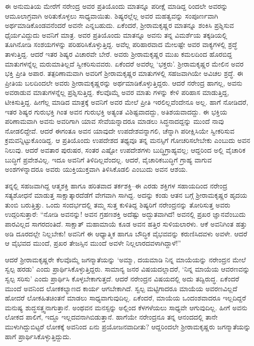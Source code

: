 ಈ ಅನುಮತಿಯ ಮೇರೆಗೆ ನರೇಂದ್ರ ಅವರ ಪ್ರತಿಯೊಂದು ಮಾತನ್ನೂ ಪರೀಕ್ಷೆ ಮಾಡಿದ್ದ ರಿಂದಲೇ ಅವರನ್ನು ಆಮೂಲಾಗ್ರವಾಗಿ ಅರಿತುಕೊಳ್ಳಲು ಸಾಧ್ಯವಾಯಿತು. ಶಿಷ್ಯರಲ್ಲೆಲ್ಲ ಅವರ ಮಹತ್ವವನ್ನು ಸಂಪೂರ್ಣವಾಗಿ ಅರ್ಥಮಾಡಿಕೊಂಡವನೆಂದರೆ ಅವನೇ ಎನ್ನಬಹುದು. ಏಕೆಂದರೆ, ಶ್ರೀರಾಮಕೃಷ್ಣರ ಮಾತನ್ನೂ ಶಂಕಿಸಿ ಪ್ರಶ್ನಿಸುವ ಧೈರ್ಯವಿದ್ದುದು ಅವನಿಗೆ ಮಾತ್ರ. ಅವರ ಪ್ರತಿಯೊಂದು ಮಾತನ್ನೂ ಅವನು ತನ್ನ ವಿಮರ್ಶೆಯ ತಕ್ಕಡಿಯಲ್ಲಿ ತೂಗಿನೋಡಿ ಸಂಶಯಗಳನ್ನು ಪರಿಹರಿಸಿಕೊಳ್ಳುತ್ತಿದ್ದ. ಅವೆಲ್ಲ ಪರಿಹಾರವಾದ ಮೇಲಷ್ಟೇ ಅವರ ವಾಕ್ಯಗಳಲ್ಲಿ ಶ್ರದ್ಧೆ ತಾಳುತ್ತಿದ್ದ. ಆದರೆ ಇತರ ಶಿಷ್ಯರ ವಿಚಾರವೇ ಬೇರೆ. ಅವರು ಶ್ರೀರಾಮಕೃಷ್ಣರ ಮುಖ ಕಮಲದಿಂದ ಹೊರಬಿದ್ದ ಮಾತುಗಳನ್ನೆಲ್ಲ ಮರುಮಾತಿಲ್ಲದೆ ಸ್ವೀಕರಿಸುವವರು. ಏಕೆಂದರೆ ಅವರೆಲ್ಲ ‘ಭಕ್ತರು’. ಶ್ರೀರಾಮಕೃಷ್ಣರ ಮೇಲಿನ ಅವರ ಭಕ್ತಿ ಪ್ರೀತಿ ಅಪಾರ. ತತ್ಪರಿಣಾಮವಾಗಿ ಅವರಿಗೆ ಶ್ರೀರಾಮಕೃಷ್ಣರ ಮಾತುಗಳಲ್ಲಿ ಸಹಜವಾಗಿಯೇ ಅವಿಚಲ ಶ್ರದ್ಧೆ. ಈ ಪ್ರೀತಿಯ ಬಲದಿಂದಲೇ ಅವರು ಶ್ರೀರಾಮಕೃಷ್ಣರನ್ನು ಅರ್ಥಮಾಡಿಕೊಳ್ಳುತ್ತಿದ್ದರು. ಆದರೆ ನರೇಂದ್ರ ಹಾಗಲ್ಲ, ಅವನು ಅವರಾಡುವ ಮಾತುಗಳನ್ನೆಲ್ಲ ಪ್ರಶ್ನಿಸುತ್ತಿದ್ದ. ಕೆಲವೊಮ್ಮೆ ಅವರ ಮಾತು ಗಳನ್ನು ಕೇಳಿ ಪರಿಹಾಸ ಮಾಡುತ್ತಿದ್ದ, ಟೀಕಿಸುತ್ತಿದ್ದ. ಹೀಗೆಲ್ಲ ಮಾಡಿದ ಮಾತ್ರಕ್ಕೆ ಅವನಿಗೆ ಅವರ ಮೇಲೆ ಪ್ರೀತಿ ಇರಲಿಲ್ಲವೆಂದೇನೂ ಅಲ್ಲ. ಹಾಗೆ ನೋಡಿದರೆ, ಇತರ ಶಿಷ್ಯರ ಗುರುಭಕ್ತಿ ಗಿಂತ ಅವನ ಗುರುಭಕ್ತಿ ಅತ್ಯಂತ ವಿಶಿಷ್ಟವಾದದ್ದು, ಅತಿಶಯವಾದದ್ದು. ಈ ಭಕ್ತಿಯ ಪರಿಣಾಮವಾಗಿ ಅವನು ಅವರಿಗಾಗಿ ಯಾವ ಸೇವೆಯನ್ನಾದರೂ ಮಾಡಲು ಸಿದ್ಧನಾದದ್ದನ್ನು ಮುಂದೆ ನಾವು ನೋಡಲಿದ್ದೇವೆ. ಆದರೆ ಈಗಂತೂ ಅವನ ಯಾವುದೇ ಉಪದೇಶವನ್ನಾಗಲಿ, ಚೆನ್ನಾಗಿ ಪರೀಕ್ಷಿಸಿಯೇ ಸ್ವೀಕರಿಸುವ ಕ್ರಮವನ್ನಿಟ್ಟುಕೊಂಡಿದ್ದ. ಆ ಪ್ರತಿಯೊಂದು ಉಪದೇಶದ ತಥ್ಯವೂ ತನ್ನ ಮನಸ್ಸಿಗೆ ಗೋಚರಿಸಲೇಬೇಕು ಎಂಬುದು ಅವನ ನಿಲುವು. ಆದರೆ ಅವತಾರ ಪುರುಷರ, ಸಂತರ ಎಷ್ಟೋ ಉಪದೇಶಗಳು ಬುದ್ಧಿಗ್ರಾಹ್ಯವಲ್ಲ; ಆದ್ದರಿಂದ ಅಲ್ಲಿ ವೈಚಾರಿಕ ಬುದ್ಧಿಗೆ ಪ್ರವೇಶವಿಲ್ಲ. ಇದೂ ಅವನಿಗೆ ತಿಳಿದಿಲ್ಲವೆಂದಲ್ಲ. ಆದರೆ, ವೈಚಾರಿಕಬುದ್ಧಿಗೆ ಗ್ರಾಹ್ಯ ವಾಗುವ ಅಂಶಗಳನ್ನಾದರೂ ಅವರು ಯುಕ್ತಿಯುಕ್ತವಾಗಿ ತಿಳಿಸಿಕೊಡಲಿ ಎಂಬುದು ಅವನ ಆಶಯ.

ತನ್ನಲ್ಲಿ ಸಹಜವಾಗಿದ್ದ ಆತ್ಮಶಕ್ತಿ ಹಾಗೂ ಹರಿತವಾದ ತರ್ಕಶಕ್ತಿ–ಈ ಎರಡು ಶಕ್ತಿಗಳ ಸಹಾಯದಿಂದ ನರೇಂದ್ರ ಸತ್ಯಶೋಧನೆ ಮಾಡುತ್ತ ಸಾಕ್ಷಾತ್ಕಾರದೆಡೆಗೆ ವೇಗವಾಗಿ ಸಾಗಿದ್ದ. ಅದನ್ನು ಕಂಡು ಆತನ ಬಗ್ಗೆ ಶ್ರೀರಾಮಕೃಷ್ಣರ ಹೃದಯ ತುಂಬಿ ಬರುತ್ತಿತ್ತು. ಒಂದು ಸಂದರ್ಭದಲ್ಲಿ ತಮ್ಮ ಸುತ್ತ ಕುಳಿತಿದ್ದ ಶಿಷ್ಯರಿಗೆ ನರೇಂದ್ರನನ್ನು ತೋರಿಸುತ್ತ ಅವರು ಉದ್ಗರಿಸುತ್ತಾರೆ: “ನೋಡಿ ಅವನನ್ನು! ಅವನ ಗ್ರಹಣಶಕ್ತಿ ಅದೆಷ್ಟು ಅದ್ಭುತವಾಗಿದೆ! ಅವನಲ್ಲಿ ಪ್ರಖರ ಜ್ಞಾನವೆಂಬುದು ಪಾರವಿಲ್ಲದ ಸಾಗರದಂತಿದೆ. ಸಾಕ್ಷಾತ್ ಮಹಾಮಾಯೆ ಕೂಡ ಅವನ ಹತ್ತಿರ ಸುಳಿಯಲಾರಳು. ಆಕೆ ಅವನಿಗಿಂತ ಹತ್ತು ಅಡಿ ದೂರದಲ್ಲೇ ನಿಲ್ಲಬೇಕು! ಅವನಿಗೆ ಈ ಆಧ್ಯಾತ್ಮಿಕ ಹಾಗೂ ಬೌದ್ಧಿಕ ವೈಭವವನ್ನು ಕರುಣಿಸಿದವಳು ಅವಳೇ. ಆದರೆ ಆ ವೈಭವದ ಮುಂದೆ, ಪ್ರಖರ ತೇಜಸ್ಸಿನ ಮುಂದೆ ಅವಳೇ ನಿಲ್ಲಲಾರದವಳಾಗಿದ್ದಾಳೆ!”

ಆದರೆ ಶ್ರೀರಾಮಕೃಷ್ಣರೇ ಕೆಲವೊಮ್ಮೆ ಜಗನ್ಮಾತೆಯನ್ನು ‘ಅಮ್ಮಾ, ದಯಮಾಡಿ ನಿನ್ನ ಮಾಯೆಯನ್ನು ನರೇಂದ್ರನ ಮೇಲೆ ಸ್ವಲ್ಪ ಹರಡು’ ಎಂದು ಪ್ರಾರ್ಥಿಸಿಕೊಳ್ಳುತ್ತಿದ್ದರು. ಸಾಮಾನ್ಯ ಜನರ ವಿಷಯದಲ್ಲಾದರೆ, ‘ನಿನ್ನ ಮಾಯೆಯ ಆವರಣವನ್ನು ಸ್ವಲ್ಪ ಸರಿಸು’ ಎಂದು ಪ್ರಾರ್ಥಿಸಿ ಕೊಳ್ಳಬೇಕಾಗುತ್ತದೆ. ಆದರೆ ನರೇಂದ್ರನ ವಿಷಯದಲ್ಲಿ ಅದು ತದ್ವಿರುದ್ಧ. ಏಕೆಂದರೆ ಮುಂದೆ ಅವನಿಂದ ಲೋಕಕಲ್ಯಾಣದ ಕಾರ್ಯ ಆಗಬೇಕಾಗಿದೆ. ಸ್ವಲ್ಪ ಮಟ್ಟಿಗಾದರೂ ಮಾಯೆಯ ಅವರಣವಿಲ್ಲದೆ ಹೋದರೆ ಲೋಕಹಿತಚಿಂತನೆ ಮಾಡಲು ಸಾಧ್ಯವಾಗುವುದಿಲ್ಲ. ಏಕೆಂದರೆ, ಮಾಯೆಯ ಒಂದಂಶವಾದರೂ ಇಲ್ಲದಿದ್ದರೆ ಮನುಷ್ಯ ಶುದ್ಧಸತ್ತ್ವನಾಗುತ್ತಾನೆ. ಅಂಥವನ ಮನಸ್ಸನ್ನು ಅಲ್ಲಿಂದ ಕೆಳಗಳೆಯಲು ಸಾಧ್ಯವೇ ಆಗುವುದಿಲ್ಲ. ಹೀಗೆ ಅವನು ಲೋಕದ ಪಾಲಿಗೆ, ಇದ್ದೂ ಇಲ್ಲದವನಾಗಿಬಿಡುತ್ತಾನೆ. ಹಾಗೆಯೇ ನರೇಂದ್ರನೂ ತನ್ನ ಆನಂದದಲ್ಲಿ ತಾನೇ ಮುಳುಗಿದ್ದುಬಿಟ್ಟರೆ ಲೋಕಕ್ಕೆ ಅವನಿಂದ ಏನು ಪ್ರಯೋಜನವಾದೀತು? ಆದ್ದರಿಂದಲೇ ಶ್ರೀರಾಮಕೃಷ್ಣರು ಜಗನ್ಮಾತೆಯನ್ನು ಹಾಗೆ ಪ್ರಾರ್ಥಿಸಿಕೊಳ್ಳುತ್ತಿದ್ದುದು.

